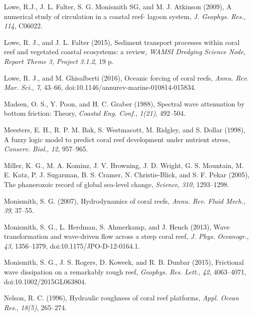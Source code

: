 \documentclass[default,jgrga]{agutex2015}
\begin{document}
\begin{article}
\begin{thebibliography}{}
Lowe, R.J., J. L. Falter, S. G. Monismith SG, and M. J. Atkinson (2009), A numerical study of circulation in a coastal reef-
lagoon system, \textit{J. Geophys. Res.}, \textit{114}, C06022.

Lowe, R. J., and J. L. Falter (2015), Sediment transport processes within coral reef and vegetated coastal ecosystems: a review, \textit{WAMSI Dredging Science Node, Report Theme 3, Project 3.1.2}, 19 p.

Lowe, R. J., and M. Ghisalberti (2016), Oceanic forcing of coral reefs, \textit{Annu. Rev. Mar. Sci.}, \textit{7}, 43--66, doi:10.1146/annurev-marine-010814-015834.

Madsen, O. S., Y. Poon, and H. C. Graber (1988), Spectral wave attenuation by bottom friction: Theory, \textit{Coastal Eng. Conf.}, \textit{1(21)}, 492--504.

Meesters, E. H., R. P. M. Bak, S. Westmacott, M. Ridgley, and S. Dollar (1998), A fuzzy logic model to predict coral reef development under nutrient stress, \textit{Conserv. Biol.}, \textit{12}, 957--965.

Miller, K. G., M. A. Kominz, J. V. Browning, J. D. Wright, G. S. Mountain, M. E. Katz, P. J. Sugarman, B. S. Cramer, N. Christie-Blick, and S. F. Pekar (2005), The phanerozoic record of global sea-level change, \textit{Science}, \textit{310}, 1293--1298.

Monismith, S. G. (2007), Hydrodynamics of coral reefs, \textit{Annu. Rev. Fluid Mech.}, \textit{39}, 37--55.

Monismith, S. G., L. Herdman, S. Ahmerkamp, and J. Hench (2013), Wave transformation and wave-driven flow across a steep coral reef, \textit{J. Phys. Oceanogr.}, \textit{43}, 1356--1379, doi:10.1175/JPO-D-12-0164.1.

Monismith, S. G., J. S. Rogers, D. Koweek, and R. B. Dunbar (2015), Frictional wave dissipation on a remarkably rough reef, \textit{Geophys. Res. Lett.}, \textit{42}, 4063--4071, doi:10.1002/2015GL063804.

Nelson, R. C. (1996), Hydraulic roughness of coral reef platforms, \textit{Appl. Ocean Res.}, \textit{18(5)}, 265--274.


\end{thebibliography}
\end{article}
\end{document}

